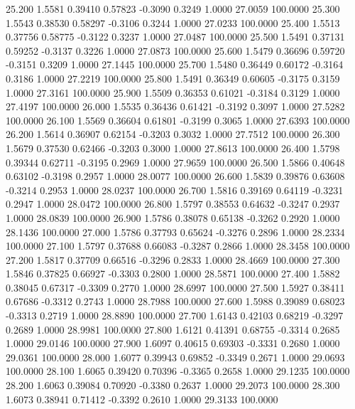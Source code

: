   25.200   1.5581   0.39410   0.57823  -0.3090   0.3249   1.0000  27.0059 100.0000
  25.300   1.5543   0.38530   0.58297  -0.3106   0.3244   1.0000  27.0233 100.0000
  25.400   1.5513   0.37756   0.58775  -0.3122   0.3237   1.0000  27.0487 100.0000
  25.500   1.5491   0.37131   0.59252  -0.3137   0.3226   1.0000  27.0873 100.0000
  25.600   1.5479   0.36696   0.59720  -0.3151   0.3209   1.0000  27.1445 100.0000
  25.700   1.5480   0.36449   0.60172  -0.3164   0.3186   1.0000  27.2219 100.0000
  25.800   1.5491   0.36349   0.60605  -0.3175   0.3159   1.0000  27.3161 100.0000
  25.900   1.5509   0.36353   0.61021  -0.3184   0.3129   1.0000  27.4197 100.0000
  26.000   1.5535   0.36436   0.61421  -0.3192   0.3097   1.0000  27.5282 100.0000
  26.100   1.5569   0.36604   0.61801  -0.3199   0.3065   1.0000  27.6393 100.0000
  26.200   1.5614   0.36907   0.62154  -0.3203   0.3032   1.0000  27.7512 100.0000
  26.300   1.5679   0.37530   0.62466  -0.3203   0.3000   1.0000  27.8613 100.0000
  26.400   1.5798   0.39344   0.62711  -0.3195   0.2969   1.0000  27.9659 100.0000
  26.500   1.5866   0.40648   0.63102  -0.3198   0.2957   1.0000  28.0077 100.0000
  26.600   1.5839   0.39876   0.63608  -0.3214   0.2953   1.0000  28.0237 100.0000
  26.700   1.5816   0.39169   0.64119  -0.3231   0.2947   1.0000  28.0472 100.0000
  26.800   1.5797   0.38553   0.64632  -0.3247   0.2937   1.0000  28.0839 100.0000
  26.900   1.5786   0.38078   0.65138  -0.3262   0.2920   1.0000  28.1436 100.0000
  27.000   1.5786   0.37793   0.65624  -0.3276   0.2896   1.0000  28.2334 100.0000
  27.100   1.5797   0.37688   0.66083  -0.3287   0.2866   1.0000  28.3458 100.0000
  27.200   1.5817   0.37709   0.66516  -0.3296   0.2833   1.0000  28.4669 100.0000
  27.300   1.5846   0.37825   0.66927  -0.3303   0.2800   1.0000  28.5871 100.0000
  27.400   1.5882   0.38045   0.67317  -0.3309   0.2770   1.0000  28.6997 100.0000
  27.500   1.5927   0.38411   0.67686  -0.3312   0.2743   1.0000  28.7988 100.0000
  27.600   1.5988   0.39089   0.68023  -0.3313   0.2719   1.0000  28.8890 100.0000
  27.700   1.6143   0.42103   0.68219  -0.3297   0.2689   1.0000  28.9981 100.0000
  27.800   1.6121   0.41391   0.68755  -0.3314   0.2685   1.0000  29.0146 100.0000
  27.900   1.6097   0.40615   0.69303  -0.3331   0.2680   1.0000  29.0361 100.0000
  28.000   1.6077   0.39943   0.69852  -0.3349   0.2671   1.0000  29.0693 100.0000
  28.100   1.6065   0.39420   0.70396  -0.3365   0.2658   1.0000  29.1235 100.0000
  28.200   1.6063   0.39084   0.70920  -0.3380   0.2637   1.0000  29.2073 100.0000
  28.300   1.6073   0.38941   0.71412  -0.3392   0.2610   1.0000  29.3133 100.0000
